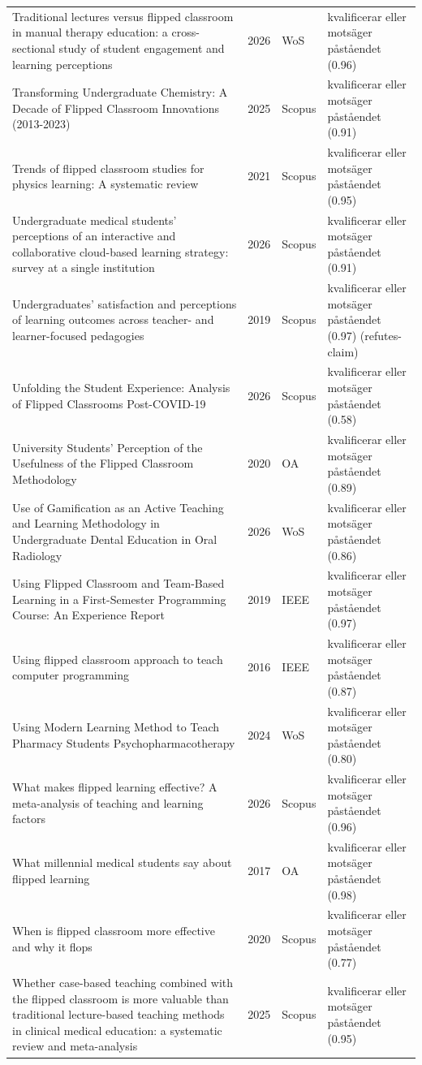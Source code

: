 \begin{longtable}{@{}%
  >{\raggedright\arraybackslash}p{}c%
  >{\raggedright\arraybackslash}p{}%
  >{\raggedright\arraybackslash}p{}@{}}
Traditional lectures versus flipped classroom in manual therapy education: a cross-sectional study of student engagement and learning perceptions & 2026 & WoS & kvalificerar eller motsäger påståendet (0.96) \\
Transforming Undergraduate Chemistry: A Decade of Flipped Classroom Innovations (2013-2023) & 2025 & Scopus & kvalificerar eller motsäger påståendet (0.91) \\
Trends of flipped classroom studies for physics learning: A systematic review & 2021 & Scopus & kvalificerar eller motsäger påståendet (0.95) \\
Undergraduate medical students' perceptions of an interactive and collaborative cloud-based learning strategy: survey at a single institution & 2026 & Scopus & kvalificerar eller motsäger påståendet (0.91) \\
Undergraduates' satisfaction and perceptions of learning outcomes across teacher- and learner-focused pedagogies & 2019 & Scopus & kvalificerar eller motsäger påståendet (0.97) (refutes-claim) \\
Unfolding the Student Experience: Analysis of Flipped Classrooms Post-COVID-19 & 2026 & Scopus & kvalificerar eller motsäger påståendet (0.58) \\
University Students' Perception of the Usefulness of the Flipped Classroom Methodology & 2020 & OA & kvalificerar eller motsäger påståendet (0.89) \\
Use of Gamification as an Active Teaching and Learning Methodology in Undergraduate Dental Education in Oral Radiology & 2026 & WoS & kvalificerar eller motsäger påståendet (0.86) \\
Using Flipped Classroom and Team-Based Learning in a First-Semester Programming Course: An Experience Report & 2019 & IEEE & kvalificerar eller motsäger påståendet (0.97) \\
Using flipped classroom approach to teach computer programming & 2016 & IEEE & kvalificerar eller motsäger påståendet (0.87) \\
Using Modern Learning Method to Teach Pharmacy Students Psychopharmacotherapy & 2024 & WoS & kvalificerar eller motsäger påståendet (0.80) \\
What makes flipped learning effective? A meta-analysis of teaching and learning factors & 2026 & Scopus & kvalificerar eller motsäger påståendet (0.96) \\
What millennial medical students say about flipped learning & 2017 & OA & kvalificerar eller motsäger påståendet (0.98) \\
When is flipped classroom more effective and why it flops & 2020 & Scopus & kvalificerar eller motsäger påståendet (0.77) \\
Whether case-based teaching combined with the flipped classroom is more valuable than traditional lecture-based teaching methods in clinical medical education: a systematic review and meta-analysis & 2025 & Scopus & kvalificerar eller motsäger påståendet (0.95) \\
\end{longtable}
\endgroup
